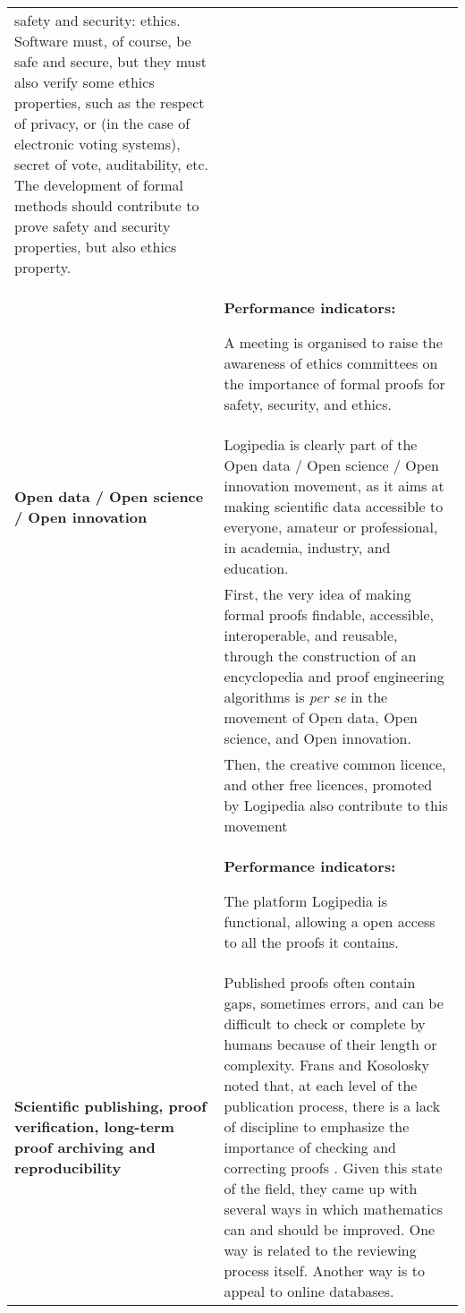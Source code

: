 \begin{longtable}{|p{}|p{}|}
safety and security: ethics.  Software must, of course, be safe and
secure, but they must also verify some ethics properties, such as
the respect of privacy, or (in the case of electronic voting systems), 
secret of vote, auditability, etc.
The development of formal methods should contribute to prove 
safety and security properties, but also ethics property.
\\
&
\colorbox{color2}{\bf Performance indicators:}
\begin{compactitem}
\item A meeting is organised to raise the awareness of ethics committees
  on the importance of formal proofs for safety, security, and ethics.
\end{compactitem}
\\
\hline
{\bf Open data / Open science / Open innovation}
&
Logipedia is clearly part of the Open data / Open science / Open
innovation movement, as it aims at making scientific data accessible
to everyone, amateur or professional, in academia, industry, and
education.\\
&
\hspace{0.4cm}
First, the very idea of making formal proofs findable, accessible,
interoperable, and reusable, through the construction of an
encyclopedia and proof engineering algorithms is {\em per se} in the
movement of Open data, Open science, and Open innovation.\\
&
\hspace{0.4cm}
Then, the creative common licence, and other free licences, promoted by 
Logipedia also contribute to this movement\\
&
\colorbox{color2}{\bf Performance indicators:}
\begin{compactitem}
\item The platform Logipedia is functional, allowing a open access to all the proofs it contains.
\end{compactitem}
\\
\hline
{\bf Scientific publishing, proof verification, long-term proof archiving and reproducibility}
&
Published proofs often contain gaps, sometimes errors, and can be difficult
to check or complete by humans because of their length or
complexity. Frans and Kosolosky noted that, at each level of the
publication process, there is a lack of discipline to emphasize the
importance of checking and correcting proofs
\cite{frans14theoria}. Given this state of the field, they came up
with several ways in which mathematics can and should be improved.
One way is related to the reviewing process itself. Another
way is to appeal to online databases.


\end{longtable}

